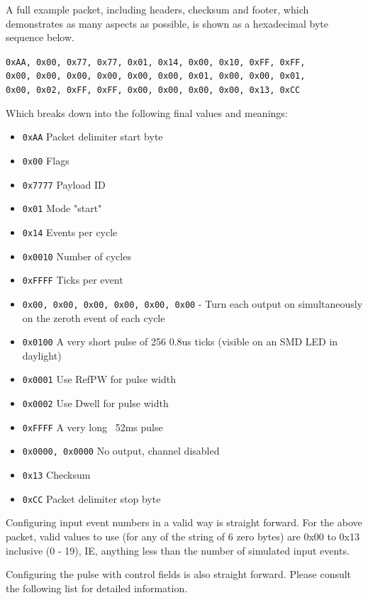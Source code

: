 \documentclass[12pt,a4paper,titlepage]{article}
\begin{document}
\begin{titlepage}
\begin{center}
A full example packet, including headers, checksum and footer, which demonstrates as many aspects as possible, is shown as a hexadecimal byte sequence below.

\texttt{0xAA, 0x00, 0x77, 0x77, 0x01, 0x14, 0x00, 0x10, 0xFF, 0xFF,\\
 0x00, 0x00, 0x00, 0x00, 0x00, 0x00, 0x01, 0x00, 0x00, 0x01,\\
 0x00, 0x02, 0xFF, 0xFF, 0x00, 0x00, 0x00, 0x00, 0x13, 0xCC}

Which breaks down into the following final values and meanings:

\begin{itemize}
\item \texttt{0xAA} Packet delimiter start byte
\item \texttt{0x00} Flags
\item \texttt{0x7777} Payload ID
\item \texttt{0x01} Mode "start"
\item \texttt{0x14} Events per cycle
\item \texttt{0x0010} Number of cycles
\item \texttt{0xFFFF} Ticks per event
\item \texttt{0x00, 0x00, 0x00, 0x00, 0x00, 0x00} - Turn each output on simultaneously on the zeroth event of each cycle
\item \texttt{0x0100} A very short pulse of 256 0.8us ticks (visible on an SMD LED in daylight)
\item \texttt{0x0001} Use RefPW for pulse width
\item \texttt{0x0002} Use Dwell for pulse width
\item \texttt{0xFFFF} A very long ~52ms pulse
\item \texttt{0x0000, 0x0000} No output, channel disabled
\item \texttt{0x13} Checksum
\item \texttt{0xCC} Packet delimiter stop byte
\end{itemize}

Configuring input event numbers in a valid way is straight forward. For the above packet, valid values to use (for any of the string of 6 zero bytes) are 0x00 to 0x13 inclusive (0 - 19), IE, anything less than the number of simulated input events.

Configuring the pulse with control fields is also straight forward. Please consult the following list for detailed information.


\end{center}
\end{titlepage}
\end{document}
